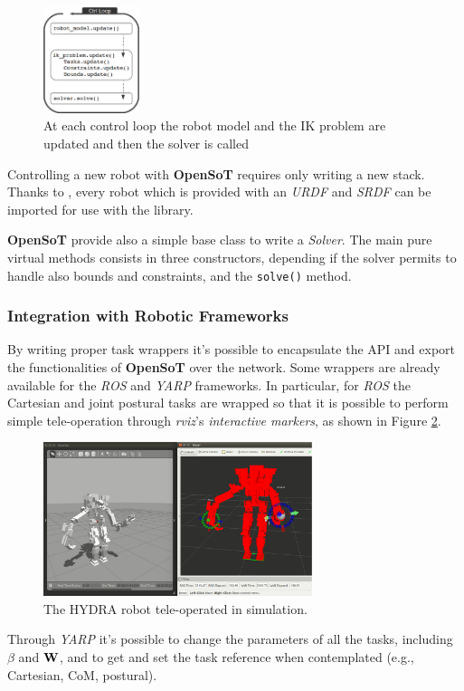 \begin{figure}[!ht]
\vspace{2 mm}
\centering
\includegraphics[width=0.25\textwidth]{images/software/update.eps}
\caption{At each control loop the robot model and the IK problem are updated and then the solver is called}
\label{update}
\end{figure}

Controlling a new robot with \textbf{OpenSoT} requires only writing a new stack. Thanks to , every robot which is provided with an \emph{URDF} and \emph{SRDF} can be imported for use with the library.

\textbf{OpenSoT} provide also a simple base class to write a \emph{Solver}. The main pure virtual methods consists in three constructors, depending if the solver permits to handle also bounds and constraints, and the \texttt{\small solve()} method. 

\subsubsection{Integration with Robotic Frameworks}
\label{sec:integration_with_robotic_frameworks}
By writing proper task wrappers it's possible to encapsulate the API and export the functionalities of \textbf{OpenSoT} over the network. Some wrappers are already available for the \emph{ROS} and \emph{YARP} frameworks. In particular, for \emph{ROS} the Cartesian and joint postural tasks are wrapped so that it is possible to perform simple tele-operation  through \emph{rviz}'s \emph{interactive markers}, as shown in Figure \ref{opensot_interactive_markers}.
\begin{figure}[!ht]
\vspace{2 mm}
\centering
\includegraphics[width=0.7\textwidth]{images/software/hydra_tele_operation.eps}
\caption{The HYDRA robot tele-operated in simulation.}
\label{opensot_interactive_markers}
\end{figure}
Through \emph{YARP} it's possible to change the parameters of all the tasks, including $\beta$ and $\mathbf{W}$, and to get and set the task reference when contemplated (e.g., Cartesian, CoM, postural).

